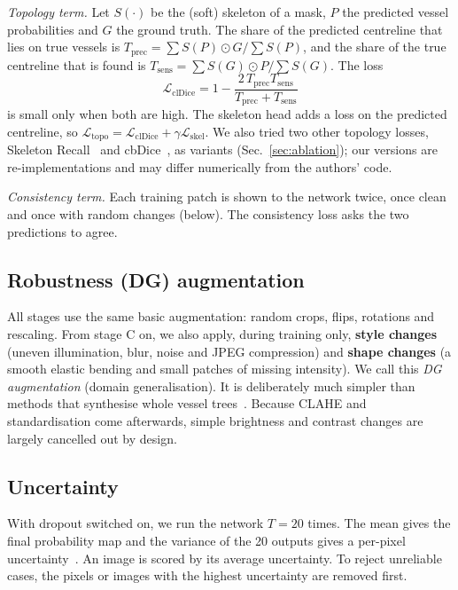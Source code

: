 \documentclass[conference]{IEEEtran}
\begin{document}
\emph{Topology term.} Let $S(\cdot)$ be the (soft) skeleton of a mask, $P$ the predicted vessel probabilities and $G$ the ground truth. The share of the predicted centreline that lies on true vessels is $T_{\mathrm{prec}}=\sum S(P)\odot G/\sum S(P)$, and the share of the true centreline that is found is $T_{\mathrm{sens}}=\sum S(G)\odot P/\sum S(G)$. The loss
\begin{equation}
\mathcal L_{\mathrm{clDice}}=1-\frac{2\,T_{\mathrm{prec}}T_{\mathrm{sens}}}{T_{\mathrm{prec}}+T_{\mathrm{sens}}}
\end{equation}
is small only when both are high. The skeleton head adds a loss on the predicted centreline, so $\mathcal L_{\mathrm{topo}}=\mathcal L_{\mathrm{clDice}}+\gamma\mathcal L_{\mathrm{skel}}$. We also tried two other topology losses, Skeleton Recall~\cite{kirchhoff2024} and cbDice~\cite{shi2024}, as variants (Sec.~\ref{sec:ablation}); our versions are re-implementations and may differ numerically from the authors' code.

\emph{Consistency term.} Each training patch is shown to the network twice, once clean and once with random changes (below). The consistency loss asks the two predictions to agree.

\subsection{Robustness (DG) augmentation}
All stages use the same basic augmentation: random crops, flips, rotations and rescaling. From stage C on, we also apply, during training only, \textbf{style changes} (uneven illumination, blur, noise and JPEG compression) and \textbf{shape changes} (a smooth elastic bending and small patches of missing intensity). We call this \emph{DG augmentation} (domain generalisation). It is deliberately much simpler than methods that synthesise whole vessel trees~\cite{liu2026dgssa}. Because CLAHE and standardisation come afterwards, simple brightness and contrast changes are largely cancelled out by design.

\subsection{Uncertainty}
With dropout switched on, we run the network $T{=}20$ times. The mean gives the final probability map and the variance of the 20 outputs gives a per-pixel uncertainty~\cite{gal2016}. An image is scored by its average uncertainty. To reject unreliable cases, the pixels or images with the highest uncertainty are removed first.
\end{document}
